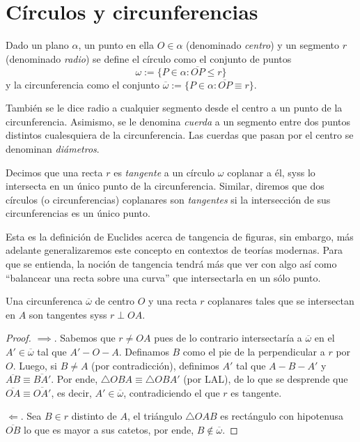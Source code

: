 \documentclass[11pt,a4paper]{book}
\begin{document}
\section{Círculos y circunferencias}
\begin{mydef}
Dado un plano $\alpha$, un punto en ella $O\in\alpha$ (denominado \textit{centro}) y un segmento $r$ (denominado \textit{radio}) se define el círculo como el conjunto de puntos
$$\omega:=\{P\in\alpha:\overline{OP}\leq r\}$$
y la circunferencia como el conjunto $\overline{\omega}:=\{P\in\alpha:\overline{OP}\equiv r\}$.

También se le dice radio a cualquier segmento desde el centro a un punto de la circunferencia. Asimismo, se le denomina \textit{cuerda} a un segmento entre dos puntos distintos cualesquiera de la circunferencia. Las cuerdas que pasan por el centro se denominan \textit{diámetros}.
\end{mydef}
\begin{mydef}
Decimos que una recta $r$ es \textit{tangente} a un círculo $\omega$ coplanar a él, syss lo intersecta en un único punto de la circunferencia. Similar, diremos que dos círculos (o circunferencias) coplanares son \textit{tangentes} si la intersección de sus circunferencias es un único punto.
\end{mydef}
Esta es la definición de Euclides acerca de tangencia de figuras, sin embargo, más adelante generalizaremos este concepto en contextos de teorías modernas. Para que se entienda, la noción de tangencia tendrá más que ver con algo así como ``balancear una recta sobre una curva'' que intersectarla en un sólo punto.
\begin{thm}
Una circunferenca $\overline{\omega}$ de centro $O$ y una recta $r$ coplanares tales que se intersectan en $A$ son tangentes syss $r\perp OA$.
\end{thm}
\begin{proof}
$\implies$. Sabemos que $r\neq OA$ pues de lo contrario intersectaría a $\overline{\omega}$ en el $A'\in\overline{\omega}$ tal que $A'-O-A$. Definamos $B$ como el pie de la perpendicular a $r$ por $O$. Luego, si $B\neq A$ (por contradicción), definimos $A'$ tal que $A-B-A'$ y $\overline{AB}\equiv\overline{BA'}$. Por ende, $\triangle OBA\equiv\triangle OBA'$ (por LAL), de lo que se desprende que $\overline{OA}\equiv\overline{OA'}$, es decir, $A'\in\overline{\omega}$, contradiciendo el que $r$ es tangente.

$\Longleftarrow$. Sea $B\in r$ distinto de $A$, el triángulo $\triangle OAB$ es rectángulo con hipotenusa $\overline{OB}$ lo que es mayor a sus catetos, por ende, $B\notin\overline{\omega}$.
\end{proof}
\end{document}
